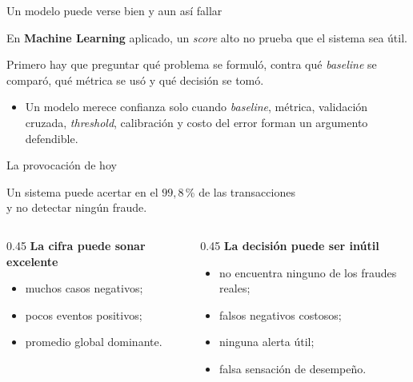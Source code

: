 \documentclass[aspectratio=169,12pt]{beamer}
\newcommand{\colhead}[1]{\textbf{#1}\par\vspace{2pt}}
\begin{document}
\begin{frame}{Un modelo puede verse bien y aun así fallar}
  \large
  \begin{center}
    En \textbf{Machine Learning} aplicado, un \emph{score} alto no prueba que el sistema sea útil.
  \end{center}
  Primero hay que preguntar qué problema se formuló, contra qué \emph{baseline} se comparó, qué métrica se usó y qué decisión se tomó.
  \vspace{8pt}
  \begin{itemize}
    \item Un modelo merece confianza solo cuando \emph{baseline}, métrica, validación cruzada, \emph{threshold}, calibración y costo del error forman un argumento defendible.
  \end{itemize}
\end{frame}

\begin{frame}{La provocación de hoy}
  \begin{center}
    \large Un sistema puede acertar en el $99{,}8$\,\% de las transacciones\\[4pt]
    y no detectar ningún fraude.
  \end{center}
  \vspace{4pt}
  \begin{columns}[T]
    \begin{column}{0.45\textwidth}
      \colhead{La cifra puede sonar excelente}
      \begin{itemize}
        \item muchos casos negativos;
        \item pocos eventos positivos;
        \item promedio global dominante.
      \end{itemize}
    \end{column}
    \begin{column}{0.45\textwidth}
      \colhead{La decisión puede ser inútil}
      \begin{itemize}
        \item no encuentra ninguno de los fraudes reales;
        \item falsos negativos costosos;
        \item ninguna alerta útil;
        \item falsa sensación de desempeño.
      \end{itemize}
    \end{column}
  \end{columns}
\end{frame}
\end{document}
